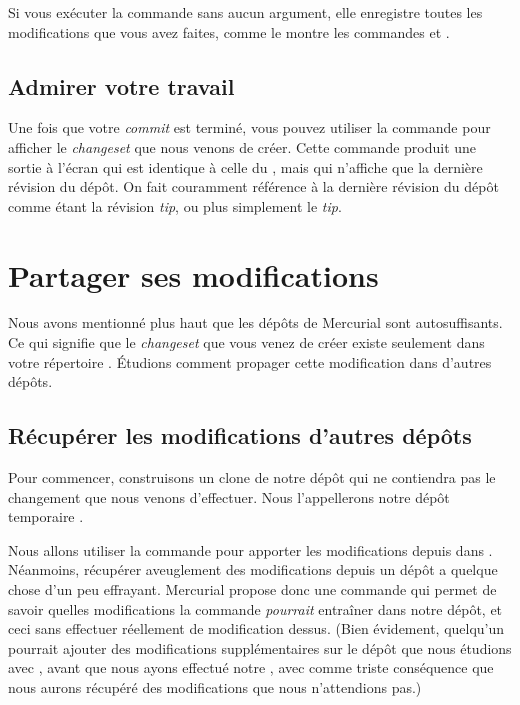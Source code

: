 Si vous exécuter la commande  sans aucun argument, elle
enregistre toutes les modifications que vous avez faites, comme le montre
les commandes  et .

\subsection{Admirer votre travail}

Une fois que votre \textit{commit} est terminé, vous pouvez utiliser
la commande  pour afficher le \textit{changeset} que nous
venons de créer. Cette commande produit une sortie à l'écran qui est
identique à celle du , mais qui n'affiche que la dernière
révision du dépôt.
On fait couramment référence à la dernière révision du dépôt comme
étant la révision \textit{tip}, ou plus simplement le \textit{tip}.

\section{Partager ses modifications}

Nous avons mentionné plus haut que les dépôts de Mercurial 
sont autosuffisants. Ce qui signifie que le \textit{changeset} 
que vous venez de créer existe seulement dans votre répertoire 
. Étudions comment propager cette modification
dans d'autres dépôts.

\subsection{Récupérer les modifications d'autres dépôts}
\label{sec:tour:pull}

Pour commencer, construisons un clone de notre dépôt  
qui ne contiendra pas le changement que nous venons d'effectuer. Nous
l'appellerons notre dépôt temporaire .


Nous allons utiliser la commande  pour apporter les 
modifications depuis  dans .
Néanmoins, récupérer aveuglement des modifications depuis un dépôt
a quelque chose d'un peu effrayant. Mercurial propose donc une 
commande  qui permet de savoir quelles modifications
la commande  \emph{pourrait} entraîner dans notre dépôt,
et ceci sans effectuer réellement de modification dessus.
(Bien évidement, quelqu'un pourrait ajouter des modifications
supplémentaires sur le dépôt que nous étudions avec ,
avant que nous ayons effectué notre , avec comme 
triste conséquence que nous aurons récupéré des modifications que 
nous n'attendions pas.)

